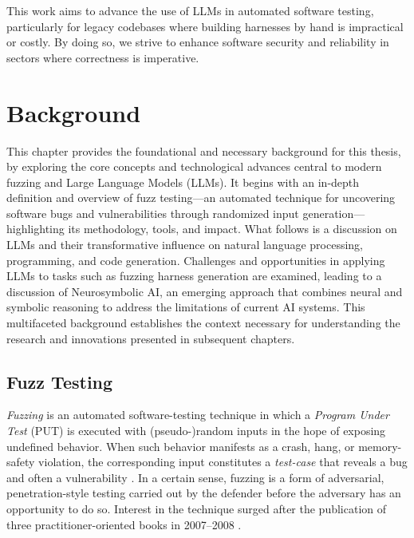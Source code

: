\documentclass[
  a4paper,
]{scrreprt}
\theoremstyle{definition}
\theoremstyle{remark}
\begin{document}
This work aims to advance the use of LLMs in automated software testing,
particularly for legacy codebases where building harnesses by hand is
impractical or costly. By doing so, we strive to enhance software
security and reliability in sectors where correctness is imperative.


\chapter{Background}\label{sec-background}

This chapter provides the foundational and necessary background for this
thesis, by exploring the core concepts and technological advances
central to modern fuzzing and Large Language Models (LLMs). It begins
with an in-depth definition and overview of fuzz testing---an automated
technique for uncovering software bugs and vulnerabilities through
randomized input generation---highlighting its methodology, tools, and
impact. What follows is a discussion on LLMs and their transformative
influence on natural language processing, programming, and code
generation. Challenges and opportunities in applying LLMs to tasks such
as fuzzing harness generation are examined, leading to a discussion of
Neurosymbolic AI, an emerging approach that combines neural and symbolic
reasoning to address the limitations of current AI systems. This
multifaceted background establishes the context necessary for
understanding the research and innovations presented in subsequent
chapters.

\section{Fuzz Testing}\label{fuzz-testing}

\emph{Fuzzing} is an automated software-testing technique in which a
\emph{Program Under Test} (PUT) is executed with (pseudo-)random inputs
in the hope of exposing undefined behavior. When such behavior manifests
as a crash, hang, or memory-safety violation, the corresponding input
constitutes a \emph{test-case} that reveals a bug and often a
vulnerability \autocite{manes2019}. In a certain sense, fuzzing is a
form of adversarial, penetration-style testing carried out by the
defender before the adversary has an opportunity to do so. Interest in
the technique surged after the publication of three
practitioner-oriented books in 2007--2008
\autocite{takanen2018,sutton2007,rathaus2007}.
\end{document}

